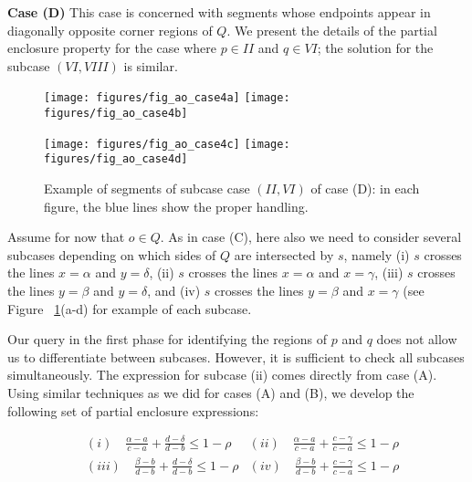 {\bf Case (D)}
This case is concerned with segments whose endpoints appear in 
diagonally opposite corner regions of $Q$. We present the details 
of the partial enclosure property for the case where $p \in II$ 
and $q \in VI$; the solution for the subcase $(VI, VIII)$ is similar.

\begin{figure}[t]
\begin{center}
  \texttt{[image: figures/fig\_ao\_case4a]}
  \hspace{1.0em}
  \texttt{[image: figures/fig\_ao\_case4b]}

  \vspace{2.0em}
  
  \texttt{[image: figures/fig\_ao\_case4c]}
  \hspace{1.0em}
  \texttt{[image: figures/fig\_ao\_case4d]}

  \caption{Example of segments of subcase case $(II, VI)$ of case (D): 
  in each figure, the blue lines show the proper handling.}
  \label{fig:rectangles:ao:case4}
\end{center}
\end{figure}

Assume for now that $o \in Q$. As in case (C), here also we need to 
consider several subcases depending on which sides of $Q$ are 
intersected by $s$, namely (i) $s$ crosses the lines $x=\alpha$ and 
$y=\delta$, (ii) $s$ crosses the lines $x=\alpha$ and $x=\gamma$, 
(iii) $s$ crosses the lines $y=\beta$ and $y=\delta$, and (iv)
$s$ crosses the lines $y=\beta$ and $x=\gamma$ (see Figure~
\ref{fig:rectangles:ao:case4}(a-d) for example of each subcase. 

Our query in the first phase for identifying the regions of $p$ and $q$ 
does not allow us to differentiate between subcases. However, 
it is sufficient to check all subcases simultaneously. The 
expression for subcase (ii) comes directly from case (A).
Using similar techniques as we did for cases (A) and (B), 
we develop the following set of partial enclosure expressions:

\begin{align*}
& (i) \quad \frac{\alpha - a}{c - a} + \frac{d - \delta}{d - b} \leq 1 - \rho
& (ii) \quad \frac{\alpha - a}{c - a} + \frac{c - \gamma}{c - a} \leq 1 - \rho \\
& (iii) \quad \frac{\beta  - b}{d - b} + \frac{d - \delta}{d - b} \leq 1 - \rho  
& (iv) \quad \frac{\beta  - b}{d - b} + \frac{c - \gamma}{c - a} \leq 1 - \rho \\
\end{align*}

